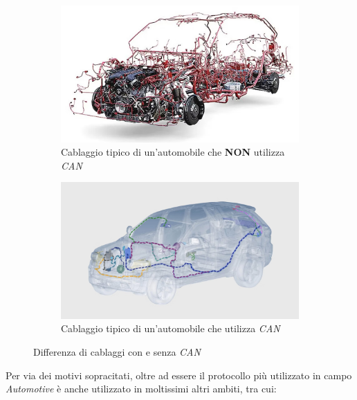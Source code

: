 \begin{figure}[h]
    \begin{subfigure}{0.45\textwidth}
        \includegraphics[width=1\textwidth]{capitoli/figure-protocolli/electrical-wiring-no-can.png}
        \caption{Cablaggio tipico di un'automobile che \textbf{NON} utilizza \emph{CAN}}
        \label{fig:electrical-wiring-no-can}
    \end{subfigure}
    \hfill
    \begin{subfigure}{0.45\textwidth}
        \includegraphics[width=1\textwidth]{capitoli/figure-protocolli/electrical-wiring-can.png}
        \caption{Cablaggio tipico di un'automobile che utilizza \emph{CAN}}
        \label{fig:electrical-wiring-can}
    \end{subfigure}
    \caption{Differenza di cablaggi con e senza \emph{CAN}}
    \label{fig:electrical-wiring-differences}
\end{figure}

Per via dei motivi sopracitati, oltre ad essere il protocollo più utilizzato in campo \emph{Automotive} è anche utilizzato in moltissimi altri ambiti, tra cui:

